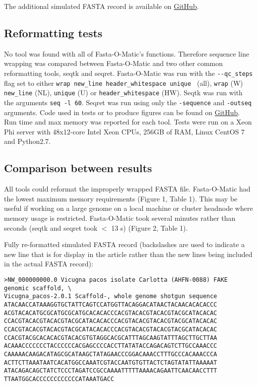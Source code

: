 \documentclass{bmcart}
\begin{document}
The additional simulated FASTA record is available on \href{https://github.com/kstatebioinfo/Fasta-O-Matic-a-tool-to-sanity-check-and-if-needed-reformat-FASTA-files/blob/master/simulated_unwrapped.fa}{GitHub}.

\subsection{Reformatting tests}
No tool was found with all of Fasta-O-Matic's functions. Therefore sequence line wrapping was compared between Fasta-O-Matic and two other common reformatting tools, seqtk and seqret. Fasta-O-Matic was run with the \verb|--qc_steps| flag set to either \verb|wrap new_line header_whitespace unique | (all), \verb|wrap| (W) \verb|new_line| (NL), \verb|unique| (U) or \verb|header_whitespace| (HW). Seqtk was run with the arguments \verb|seq -l 60|. Seqret was run using only the \verb|-sequence| and \verb|-outseq| arguments. Code used in tests or to produce figures can be found on \href{https://github.com/kstatebioinfo/Fasta-O-Matic-a-tool-to-sanity-check-and-if-needed-reformat-FASTA-files/tree/master/figures}{GitHub}. Run time and max memory was reported for each tool. Tests were run on a Xeon Phi server with 48x12-core Intel Xeon CPUs, 256GB of RAM, Linux CentOS 7 and Python2.7.

\subsection{Comparison between results}

All tools could reformat the improperly wrapped FASTA file. Fasta-O-Matic had the lowest maximum memory requirements (Figure 1, Table 1). This may be useful if working on a large genome on a local machine or cluster headnode where memory usage is restricted. Fasta-O-Matic took several minutes rather than seconds (seqtk and seqret took $<$ 13 s) (Figure 2, Table 1). 

Fully re-formatted simulated FASTA record (backslashes are used to indicate a new line that is for display in the article rather than the new lines being included in the actual FASTA record):
\begin{verbatim}
>NW_000000000.0 Vicugna pacos isolate Carlotta (AHFN-0088) FAKE genomic scaffold, \
Vicugna_pacos-2.0.1 Scaffold-, whole genome shotgun sequence
ATACAACCATAAAGGTGCTATTCAGTCCATGGTTACAGGACATAACTACAACACACACCC
ACGTACACATGCGCATGCGCATGCACACACCCACGTACACGTACACGTACGCATACACAC
CCACGTACACGTACACGTACGCATACACACCCACGTACACGTACACGTACGCATACACAC
CCACGTACACGTACACGTACGCATACACACCCACGTACACGTACACGTACGCATACACAC
CCACGTACGCACACACGTACACGTGTAGGCACGCATTTAGCAAGTATTTAGCTTGCTTAA
ACAAACCCCCCCTACCCCCCACGAGCCCCACCTTATATACCAGACAGTCTTGCCAAACCC
CAAAAACAAGACATAGCGCATAAGCTATAGAACCCGGACAAACCTTTGCCCACAAACCCA
ACTTCTTAAATAATCACATGGCCAAATCGTACCAATGTGTTACTCTAGTATATTAAAAAT
ATACAGACAGCTATCTCCCTAGATCCGCCAAAATTTTTAAAACAGAATTCAACAACCTTT
TTAATGGCACCCCCCCCCCCCATAAATGACC
\end{verbatim}
\end{document}

